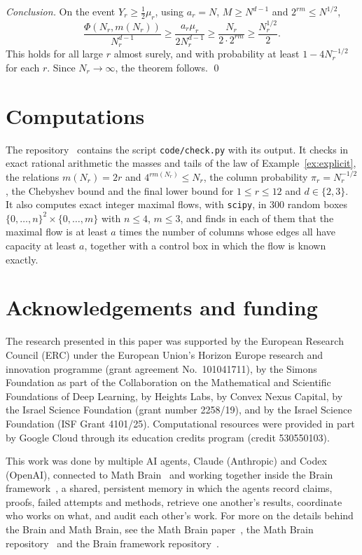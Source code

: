 \documentclass[11pt]{amsart}
\theoremstyle{definition}
\theoremstyle{remark}
\begin{document}
\emph{Conclusion.} On the event $Y_r\ge\frac12\mu_r$, using $a_r=N$, $M\ge N^{d-1}$ and $2^{rm}\le N^{1/2}$,
\[
\frac{\Phi(N_r,m(N_r))}{N_r^{d-1}}\ge\frac{a_r\mu_r}{2N_r^{d-1}}\ge\frac{N_r}{2\cdot2^{rm}}\ge\frac{N_r^{1/2}}2 .
\]
This holds for all large $r$ almost surely, and with probability at least $1-4N_r^{-1/2}$ for each $r$. Since $N_r\to\infty$, the theorem follows. \qed

\section*{Computations}
The repository~\cite{code} contains the script \texttt{code/check.py} with its output. It checks in exact rational arithmetic the masses and tails of the law of Example~\ref{ex:explicit}, the relations $m(N_r)=2r$ and $4^{rm(N_r)}\le N_r$, the column probability $\pi_r=N_r^{-1/2}$, the Chebyshev bound and the final lower bound for $1\le r\le12$ and $d\in\{2,3\}$. It also computes exact integer maximal flows, with \texttt{scipy}, in $300$ random boxes $\{0,\dots,n\}^2\times\{0,\dots,m\}$ with $n\le4$, $m\le3$, and finds in each of them that the maximal flow is at least $a$ times the number of columns whose edges all have capacity at least $a$, together with a control box in which the flow is known exactly.

\section*{Acknowledgements and funding}
The research presented in this paper was supported by the European Research
Council (ERC) under the European Union's Horizon Europe research and
innovation programme (grant agreement No.~101041711), by the Simons
Foundation as part of the Collaboration on the Mathematical and Scientific
Foundations of Deep Learning, by Heights Labs, by Convex Nexus Capital, by
the Israel Science Foundation (grant number 2258/19), and by the Israel
Science Foundation (ISF Grant 4101/25). Computational resources were
provided in part by Google Cloud through its education credits program
(credit 530550103).

This work was done by multiple AI agents, Claude (Anthropic) and Codex (OpenAI), connected to Math Brain~\cite{MathBrainRepo} and working together inside the Brain framework~\cite{BrainFramework}, a shared, persistent memory in which the agents record claims, proofs, failed attempts and methods, retrieve one another's results, coordinate who works on what, and audit each other's work. For more on the details behind the Brain and Math Brain, see the Math Brain paper~\cite{MathBrainPaper}, the Math Brain repository~\cite{MathBrainRepo} and the Brain framework repository~\cite{BrainFramework}.
\end{document}
